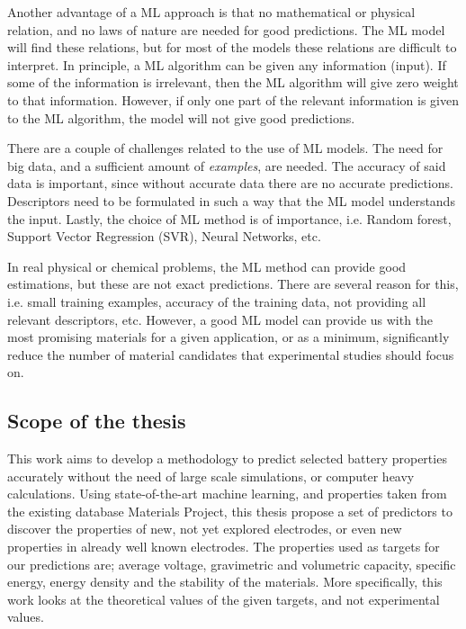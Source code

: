 Another advantage of a ML approach is that no mathematical or physical relation, and no laws of nature are needed for good predictions. The ML model will find these relations, but for most of the models these relations are difficult to interpret. In principle, a ML algorithm can be given any information (input). If some of the information is irrelevant, then the ML algorithm will give zero weight to that information. However, if only one part of the relevant information is given to the ML algorithm, the model will not give good predictions.  

There are a couple of challenges related to the use of ML models. The need for big data, and a sufficient amount of \textit{examples}, are needed. The accuracy of said data is important, since without accurate data there are no accurate predictions. Descriptors need to be formulated in such a way that the ML model understands the input. Lastly, the choice of ML method is of importance, i.e. Random forest, Support Vector Regression (\ac{SVR}), Neural Networks, etc.  

In real physical or chemical problems, the ML method can provide good estimations, but these are not exact predictions. There are several reason for this, i.e. small training examples, accuracy of the training data, not providing all relevant descriptors, etc.  However, a good ML model can provide us with the most promising materials for a given application, or as a minimum, significantly reduce the number of material candidates that experimental studies should focus on. 

\subsection{Scope of the thesis}
This work aims to develop a methodology to predict selected battery properties accurately without the need of large scale simulations, or computer heavy calculations. Using state-of-the-art machine learning, and properties taken from the existing database Materials Project, this thesis propose a set of predictors to discover the properties of new, not yet explored electrodes, or even new properties in already well known electrodes. The properties used as targets for our predictions are; average voltage, gravimetric and volumetric capacity, specific energy, energy density and the stability of the materials. More specifically, this work looks at the theoretical values of the given targets, and not experimental values. 
	
